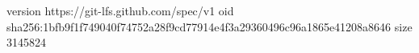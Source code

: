 version https://git-lfs.github.com/spec/v1
oid sha256:1bfb9f1f749040f74752a28f9cd77914e4f3a29360496c96a1865e41208a8646
size 3145824
